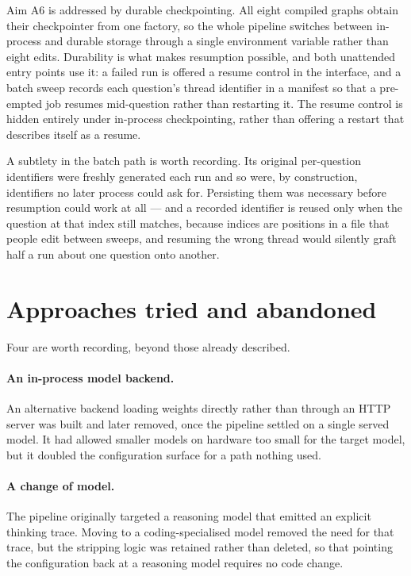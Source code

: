 Aim A6 is addressed by durable checkpointing. All eight compiled graphs obtain their
checkpointer from one factory, so the whole pipeline switches between in-process and durable
storage through a single environment variable rather than eight edits. Durability is what makes
resumption possible, and both unattended entry points use it: a failed run is offered a resume
control in the interface, and a batch sweep records each question's thread identifier in a
manifest so that a pre-empted job resumes mid-question rather than restarting it. The resume
control is hidden entirely under in-process checkpointing, rather than offering a restart that
describes itself as a resume.

A subtlety in the batch path is worth recording. Its original per-question identifiers were
freshly generated each run and so were, by construction, identifiers no later process could ask
for. Persisting them was necessary before resumption could work at all --- and a recorded
identifier is reused only when the question at that index still matches, because indices are
positions in a file that people edit between sweeps, and resuming the wrong thread would
silently graft half a run about one question onto another.

\section{Approaches tried and abandoned}
\label{sec:abandoned}

Four are worth recording, beyond those already described.

\paragraph{An in-process model backend.} An alternative backend loading weights directly rather
than through an HTTP server was built and later removed, once the pipeline settled on a single
served model. It had allowed smaller models on hardware too small for the target model, but it
doubled the configuration surface for a path nothing used.

\paragraph{A change of model.} The pipeline originally targeted a reasoning model that emitted
an explicit thinking trace. Moving to a coding-specialised model removed the need for that
trace, but the stripping logic was retained rather than deleted, so that pointing the
configuration back at a reasoning model requires no code change.

